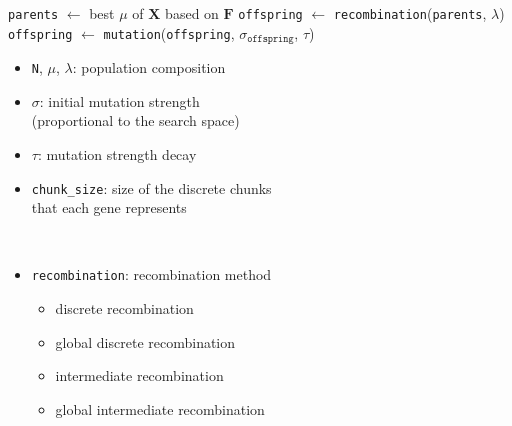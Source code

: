 \documentclass{article}
\begin{document}
\begin{algorithm}[htbp]
{        %
        \texttt{parents} $\gets$ best $\mu$ of $\mathbf{X}$ based on $\mathbf{F}$
        \texttt{offspring} $\gets$ \texttt{recombination}(\texttt{parents}, $\lambda$)
        \texttt{offspring} $\gets$ \texttt{mutation}(\texttt{offspring}, $\sigma_{\texttt{offspring}}$, $\tau$)

    }
    \BlankLine

\end{algorithm}


\begin{minipage}{0.5\textwidth}   
    \begin{itemize}
        \item \texttt{N}, $\mu$, $\lambda$: population composition
        \item $\sigma$: initial mutation strength \\ (proportional to the search space)
        \item $\tau$: mutation strength decay
        \item \texttt{chunk\_size}: size of the discrete chunks \\ that each gene represents
    \end{itemize}
\end{minipage}
~
\begin{minipage}{0.45\textwidth}
    \begin{itemize}
        \item \texttt{recombination}: recombination method
        \begin{itemize}
            \item discrete recombination
            \item global discrete recombination
            \item intermediate recombination
            \item global intermediate recombination
        \end{itemize}
    \end{itemize}
\end{minipage}
\end{document}
